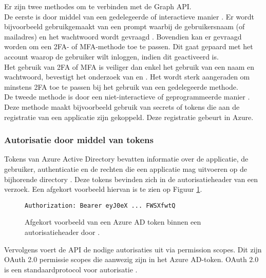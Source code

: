 Er zijn twee methodes om te verbinden met de Graph \ac{API}. \\

De eerste is door middel van een gedelegeerde of interactieve manier \autocite{Microsoft2023u}. Er wordt bijvoorbeeld gebruikgemaakt van een prompt waarbij de gebruikersnaam (of mailadres) en het wachtwoord wordt gevraagd \autocite{Bertocci2015}. Bovendien kan er gevraagd worden om een \ac{2FA}- of \ac{MFA}-methode toe te passen. Dit gaat gepaard met het account waarop de gebruiker wilt inloggen, indien dit geactiveerd is. \\

Het gebruik van \ac{2FA} of \ac{MFA} is veiliger dan enkel het gebruik van een naam en wachtwoord, bevestigt het onderzoek van \textcite{Gunson2011} en \textcite{Banyal2013}. Het wordt sterk aangeraden om minstens \ac{2FA} toe te passen bij het gebruik van een gedelegeerde methode. \\

De tweede methode is door een niet-interactieve of geprogrammeerde manier \autocite{Microsoft2023t}. Deze methode maakt bijvoorbeeld gebruik van secrets of tokens die aan de registratie van een applicatie zijn gekoppeld. Deze registratie gebeurt in Azure. 



\subsubsection{Autorisatie door middel van tokens}


Tokens van Azure Active Directory bevatten informatie over de applicatie, de gebruiker, authenticatie en de rechten die een applicatie mag uitvoeren op de bijhorende directory \autocite{Microsoft2015}. Deze tokens bevinden zich in de autorisatieheader van een verzoek. Een afgekort voorbeeld hiervan is te zien op Figuur \ref{ahtoken}. \\

\begin{figure}[h]
    \scriptsize
    \begin{verbatim}
Authorization: Bearer eyJ0eX ... FWSXfwtQ
    \end{verbatim}    
    \caption[Voorbeeld Azure AD token]{Afgekort voorbeeld van een Azure \Ac{AD} token binnen een autorisatieheader door \textcite{Microsoft2015}.}
    \label{ahtoken}
\end{figure}

Vervolgens voert de \ac{API} de nodige autorisaties uit via permission scopes. Dit zijn OAuth 2.0 permissie scopes die aanwezig zijn in het Azure \Ac{AD}-token. OAuth 2.0 is een standaardprotocol voor autorisatie \autocite{OAuth}. \\


